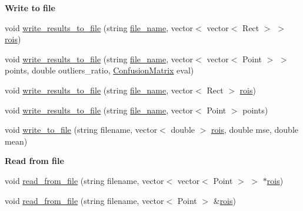\begin{Indent}{\bf Write to file}\par
\begin{DoxyCompactItemize}
\item 
void \hyperlink{classCvUtils_a78b9e8fc4f7ea2b713ab0bcca586600e}{write\-\_\-results\-\_\-to\-\_\-file} (string \hyperlink{social__robot_8cpp_a755d42f2e9c635ce2213e0efad62b796}{file\-\_\-name}, vector$<$ vector$<$ Rect $>$ $>$ \hyperlink{social__robot__onethread_8cpp_acb84e343c5602756e13a851a44128639}{rois})
\item 
void \hyperlink{classCvUtils_ad0851f0eee232adf64bd324fc3f92cf4}{write\-\_\-results\-\_\-to\-\_\-file} (string \hyperlink{social__robot_8cpp_a755d42f2e9c635ce2213e0efad62b796}{file\-\_\-name}, vector$<$ vector$<$ Point $>$ $>$ points, double outliers\-\_\-ratio, \hyperlink{classConfusionMatrix}{Confusion\-Matrix} eval)
\item 
void \hyperlink{classCvUtils_a0f3f68175623e99bc1669f3cd06fd301}{write\-\_\-results\-\_\-to\-\_\-file} (string \hyperlink{social__robot_8cpp_a755d42f2e9c635ce2213e0efad62b796}{file\-\_\-name}, vector$<$ Rect $>$ \hyperlink{social__robot__onethread_8cpp_acb84e343c5602756e13a851a44128639}{rois})
\item 
void \hyperlink{classCvUtils_a27e76804ac414cc7cdf2e34851dec86a}{write\-\_\-results\-\_\-to\-\_\-file} (string \hyperlink{social__robot_8cpp_a755d42f2e9c635ce2213e0efad62b796}{file\-\_\-name}, vector$<$ Point $>$ points)
\item 
void \hyperlink{classCvUtils_a417431598ac332bcce7a2d66add3662f}{write\-\_\-to\-\_\-file} (string filename, vector$<$ double $>$ \hyperlink{social__robot__onethread_8cpp_acb84e343c5602756e13a851a44128639}{rois}, double mse, double mean)
\end{DoxyCompactItemize}
\end{Indent}
\begin{Indent}{\bf Read from file}\par
\begin{DoxyCompactItemize}
\item 
void \hyperlink{classCvUtils_a9828a72b15006923f35d4da51359af2e}{read\-\_\-from\-\_\-file} (string filename, vector$<$ vector$<$ Point $>$ $>$ $\ast$\hyperlink{social__robot__onethread_8cpp_acb84e343c5602756e13a851a44128639}{rois})
\item 
void \hyperlink{classCvUtils_a5e7d37fa49e663f642718a1d6631ef41}{read\-\_\-from\-\_\-file} (string filename, vector$<$ Point $>$ \&\hyperlink{social__robot__onethread_8cpp_acb84e343c5602756e13a851a44128639}{rois})
\end{DoxyCompactItemize}
\end{Indent}
